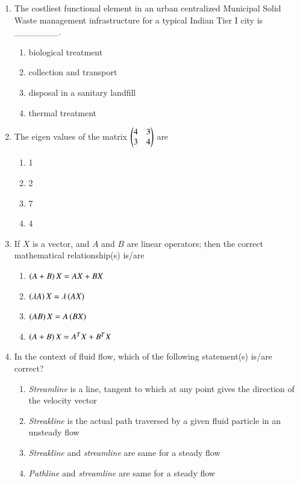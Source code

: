 \documentclass[journal]{IEEEtran}
\begin{document}
\begin{enumerate}
\item The costliest functional element in an urban centralized Municipal Solid Waste management infrastructure for a typical Indian Tier I city is \_\_\_\_\_\_\_.
\hfill{}

\begin{multicols}{2}
\begin{enumerate}
\item biological treatment
\item collection and transport
\item disposal in a sanitary landfill
\item thermal treatment
\end{enumerate}
\end{multicols}

\item The eigen values of the matrix $ \begin{pmatrix}4 & 3 \\ 3 & 4\end{pmatrix}$ are \hfill{}

\begin{multicols}{4}
\begin{enumerate}
\item 1
\item 2
\item 7
\item 4
\end{enumerate}
\end{multicols}

\item If $X$ is a vector, and $A$ and $B$ are linear operators; then the correct mathematical relationship(s) is/are \hfill{}

\begin{multicols}{2}
\begin{enumerate}
\item $\left(A+B\right)X = AX + BX$
\item $\left(\lambda A\right)X = \lambda\left(AX\right)$
\item $\left(AB\right)X = A\left(BX\right)$
\item $\left(A+B\right)X = A^TX + B^TX$
\end{enumerate}
\end{multicols}

\item In the context of fluid flow, which of the following statement(s) is/are correct? \hfill{}

\begin{enumerate}
\item \textit{Streamline} is a line, tangent to which at any point gives the direction of the velocity vector
\item \textit{Streakline} is the actual path traversed by a given fluid particle in an unsteady flow
\item \textit{Streakline} and \textit{streamline} are same for a steady flow
\item \textit{Pathline} and \textit{streamline} are same for a steady flow
\end{enumerate}


\end{enumerate}
\end{document}
